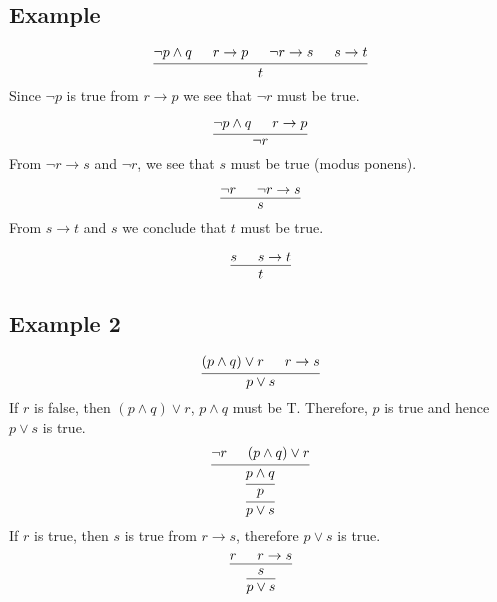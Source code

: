 \documentclass{article}
\theoremstyle{mytheoremstyle}
\theoremstyle{mytheoremstyle}
\theoremstyle{myproblemstyle}
\begin{document}
    \subsection*{Example}
    \[
        \begin{prooftree}
            \hypo{\neg p \wedge q}
            \hypo{r \rightarrow p}
            \hypo{\neg r \rightarrow s}
            \hypo{s \rightarrow t}
            \infer4{t}
        \end{prooftree}
    \]
    Since $\neg p$ is true from $r \rightarrow p$ we see that $\neg r$ must be
    true.

    \[
        \begin{prooftree}
            \hypo{\neg p \wedge q}
            \hypo{r \rightarrow p}
            \infer2{\neg r}
        \end{prooftree}
    \]
    From $\neg r \rightarrow s$ and $\neg r$, we see that $s$ must be true
    (modus ponens).

    \[
        \begin{prooftree}
            \hypo{\neg r}
            \hypo{\neg r \rightarrow s}
            \infer2{s}
        \end{prooftree}
    \]
    From $s \rightarrow t$ and $s$ we conclude that $t$ must be true.

    \[
        \begin{prooftree}
            \hypo{s}
            \hypo{s \rightarrow t}
            \infer2{t}
        \end{prooftree}
    \]

    \subsection*{Example 2}
    \[
        \begin{prooftree}
            \hypo{(p \wedge q) \vee r}
            \hypo{r \rightarrow s}
            \infer2{p \vee s}
        \end{prooftree}
    \]
    If $r$ is false, then $(p \wedge q) \vee r$, $p \wedge q$ must be T.
    Therefore, $p$ is true and hence $p \vee s$ is true.
    \[
        \begin{prooftree}
            \hypo{\neg r}
            \hypo{(p \wedge q) \vee r}
            \infer2{p \wedge q}
            \infer1{p}
            \infer1{p \vee s}
        \end{prooftree}
    \]
    If $r$ is true, then $s$ is true from $r \rightarrow s$, therefore $p \vee
    s$ is true.
    \[
        \begin{prooftree}
            \hypo{r}
            \hypo{r \rightarrow s}
            \infer2{s}
            \infer1{p \vee s}
        \end{prooftree}
    \]
\end{document}
